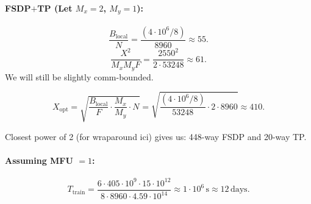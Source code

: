 \documentclass[11pt]{article}
\newcommand{\Ttrain}{T_{\text{train}}}
\begin{document}
\paragraph{FSDP$+$TP (Let $M_x = 2$, $M_y = 1$):}
\[
\frac{B_{\text{local}}}{N} = \frac{(4 \cdot 10^6 / 8)}{8960} \approx 55.
\]
\[
\frac{X^2}{M_x M_y F} = \frac{2550^2}{2 \cdot 53248} \approx 61.
\]
We will still be slightly comm-bounded.

\[
X_{\text{opt}} = \sqrt{\frac{B_{\text{local}}}{F} \cdot \frac{M_x}{M_y} \cdot N}
              = \sqrt{\frac{(4 \cdot 10^6 / 8)}{53248} \cdot 2 \cdot 8960} \approx 410.
\]

Closest power of 2 (for wraparound ici) gives us: 448-way FSDP and 20-way TP.

\paragraph{Assuming MFU $= 1$:}
\[
\Ttrain = \frac{6 \cdot 405 \cdot 10^9 \cdot 15 \cdot 10^{12}}{8 \cdot 8960 \cdot 4.59 \cdot 10^{14}}
        \approx 1 \cdot 10^6\,\text{s} \approx 12\,\text{days.}
\]
\end{document}
